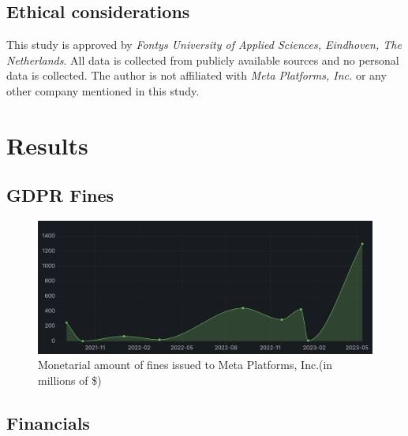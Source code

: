 \documentclass[12pt, a4paper]{article}
\begin{document}
\subsection*{Ethical considerations}

This study is approved by \textit{Fontys University of Applied Sciences,
Eindhoven, The Netherlands}. All data is collected from publicly available
sources and no personal data is collected. The author is not affiliated with
\textit{Meta Platforms, Inc.} or any other company mentioned in this study.

\section*{Results}

\subsection*{GDPR Fines}

\begin{figure}[H]
    \centering
    \includegraphics[width=1.00\textwidth]{monetarial-amount-of-gdpr-fines}
    \caption{Monetarial amount of fines issued to Meta Platforms, Inc.(in
    millions of
    \$)\cite{gdprFine1,gdprFine2,gdprFine3,gdprFine4,gdprFine5,gdprFine6,gdprFine7,gdprFine8,gdprFine9}}
    \label{fig:amount-of-gdpr-fines}
\end{figure}


\subsection*{Financials}
\end{document}
